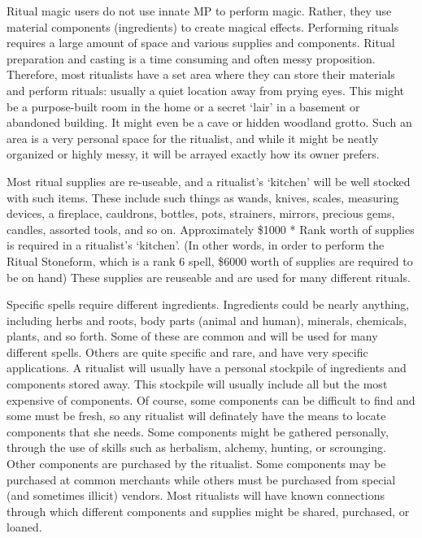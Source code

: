 \documentclass[twoside]{book}
\begin{document}
    {  
      Ritual magic users do not use innate MP to perform
               magic. Rather, they use material components (ingredients)
               to create magical effects. Performing rituals requires a
               large amount of space and various supplies and components.
               Ritual preparation and casting is a time consuming and
               often messy proposition. Therefore, most ritualists have a
               set area where they can store their materials and perform
               rituals: usually a quiet location away from prying eyes.
               This might be a purpose-built room in the home or a secret
               `lair' in a basement or abandoned building. It
               might even be a cave or hidden woodland grotto. Such an
               area is a very personal space for the ritualist, and while
               it might be neatly organized or highly messy, it will be
               arrayed exactly how its owner prefers. 
    }
  
    {  
      Most ritual supplies are re-useable, and a
               ritualist's `kitchen' will be well
               stocked with such items. These include such things as
               wands, knives, scales, measuring devices, a fireplace,
               cauldrons, bottles, pots, strainers, mirrors, precious
               gems, candles, assorted tools, and so on. Approximately
               \$1000 * Rank worth of supplies is required in a
               ritualist's `kitchen'. (In other words,
               in order to perform the Ritual Stoneform, which is a rank
               6 spell, \$6000 worth of supplies are required to be on
               hand) These supplies are reuseable and are used for many
               different rituals. 
    }
  
    {  
      Specific spells require different ingredients.
               Ingredients could be nearly anything, including herbs and
               roots, body parts (animal and human), minerals, chemicals,
               plants, and so forth. Some of these are common and will be
               used for many different spells. Others are quite specific
               and rare, and have very specific applications. A ritualist
               will usually have a personal stockpile of ingredients and
               components stored away. This stockpile will usually
               include all but the most expensive of components. Of
               course, some components can be difficult to find and some
               must be fresh, so any ritualist will definately have the
               means to locate components that she needs. Some components
               might be gathered personally, through the use of skills
               such as herbalism, alchemy, hunting, or scrounging. Other
               components are purchased by the ritualist. Some components
               may be purchased at common merchants while others must be
               purchased from special (and sometimes illicit) vendors.
               Most ritualists will have known connections through which
               different components and supplies might be shared,
               purchased, or loaned. 
    }
  
\end{document}
